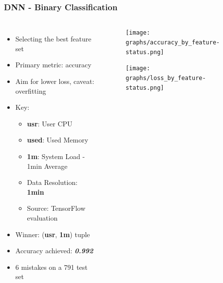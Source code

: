 \documentclass[aspectratio=169,11pt,hyperref={colorlinks=true}]{beamer}
\begin{document}
\begin{frame}
    \frametitle{DNN - Binary Classification}
    \begin{columns}
        \begin{itemize}
            \item{Selecting the best feature set}
            \item{Primary metric: accuracy}
            \item{Aim for lower loss, caveat: overfitting}
            \item{Key:}
            \begin{itemize}
              \item{\textbf{usr}: User CPU}
              \item{\textbf{used}: Used Memory}
              \item{\textbf{1m}: System Load - 1min Average}
              \item{Data Resolution: \textbf{1min}}
              \item{Source: TensorFlow evaluation}
            \end{itemize}
            \item{Winner: (\textbf{usr}, \textbf{1m}) tuple}
            \item{Accuracy achieved: \emph{\textbf{0.992}}}
            \item{6 mistakes on a 791 test set}
        \end{itemize}
        \begin{center}
        \begin{figure}
          \texttt{[image: graphs/accuracy\_by\_feature-status.png]}
        \end{figure}
        \begin{figure}
          \texttt{[image: graphs/loss\_by\_feature-status.png]}
        \end{figure}
      \end{center}
  \end{columns}
\end{frame}
\end{document}
